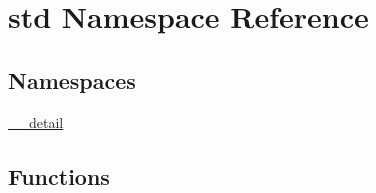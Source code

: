 \hypertarget{namespacestd}{}\section{std Namespace Reference}
\label{namespacestd}
\subsection*{Namespaces}
\begin{DoxyCompactItemize}
\item 
 \hyperlink{namespacestd_1_1____detail}{\+\_\+\+\_\+detail}
\end{DoxyCompactItemize}
\subsection*{Functions}
